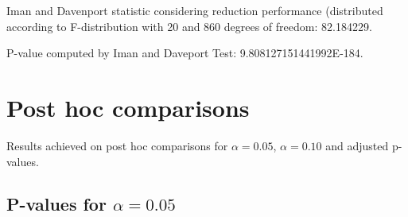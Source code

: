 \documentclass[a4paper,10pt]{article}
\begin{document}
\begin{landscape}
Iman and Davenport statistic considering reduction performance (distributed according to F-distribution with 20 and 860 degrees of freedom: 82.184229.

P-value computed by Iman and Daveport Test: 9.808127151441992E-184.\newline



\pagebreak

\section{Post hoc comparisons}

Results achieved on post hoc comparisons for $\alpha = 0.05$, $\alpha = 0.10$ and adjusted p-values.

\subsection{P-values for $\alpha=0.05$}


\end{landscape}
\end{document}
